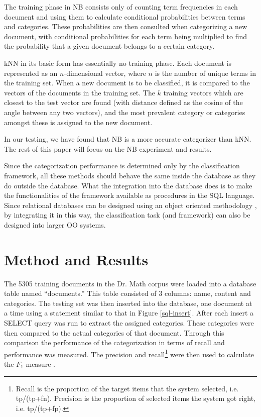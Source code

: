 \documentclass{article}
\begin{document}
The training phase in NB consists only of counting term frequencies in
each document and using them to calculate conditional probabilities
between terms and categories.  These probabilities are then consulted
when categorizing a new document, with conditional probabilities for
each term being multiplied to find the probability that a given
document belongs to a certain category.

kNN in its basic form has essentially no training phase.  Each
document is represented as an $n$-dimensional vector, where $n$ is the
number of unique terms in the training set.  When a new document is to
be classified, it is compared to the vectors of the documents in the
training set. The $k$ training vectors which are closest to the test
vector are found (with distance defined as the cosine of the angle
between any two vectors), and the most prevalent category or
categories amongst these is assigned to the new document.

In our testing, we have found that NB is a more accurate categorizer
than kNN.  The rest of this paper will focus on the NB experiment and results.

Since the categorization performance is determined only by the classification 
framework, all these methods should behave the same inside the
database as they do outside 
the database. What the integration into the database does is to make the 
functionalities of the framework available as procedures in the SQL language.
Since relational databases can be designed using an object oriented methodology \cite{blaha:88,
rumbaugh:91}, by integrating it in this way, the classification task 
(and framework) can also be designed into larger OO systems.

\section{Method and Results}
\label{results}

 
The 5305 training documents in the Dr. Math corpus were loaded into a database 
table named ``documents.'' This table consisted of 3 columns: name, content and 
categories. The testing set was then inserted into the database, one document at a time 
using a statement similar to that in Figure \ref{sql-insert}. After each insert a SELECT query was 
run to extract the assigned categories. These categories were then compared to the 
actual categories of that document. Through this comparison the performance of the 
categorization in terms of recall  and performance  was measured. The precision and 
recall\footnote{Recall is the proportion of the target items that the
system selected, i.e. tp/(tp+fn).  Precision is the proportion of
selected items the system got right, i.e. tp/(tp+fp).} were then used
to calculate the $F_1$ measure \cite{calvo:01,sebastiani:02}.
\end{document}
